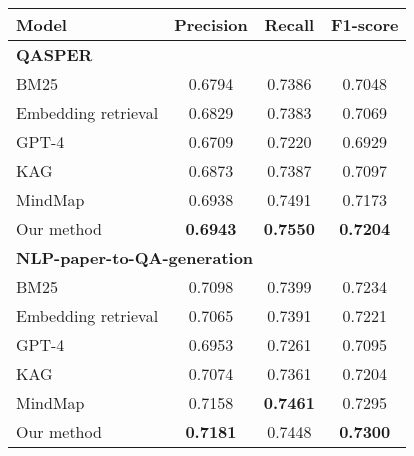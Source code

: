 \begin{tabular}{lccc}
\toprule
\textbf{Model} & \textbf{Precision} & \textbf{Recall} & \textbf{F1-score} \\
\midrule
\multicolumn{4}{l}{\textbf{QASPER}} \\
\midrule
BM25           & 0.6794     & 0.7386     & 0.7048           \\
Embedding retrieval & 0.6829 & 0.7383 & 0.7069           \\
\midrule
GPT-4           & 0.6709     & 0.7220     & 0.6929           \\
\midrule
KAG            & 0.6873     & 0.7387     & 0.7097           \\
MindMap        & 0.6938     & 0.7491     & 0.7173           \\
Our method      & \textbf{0.6943}     & \textbf{0.7550}     & \textbf{0.7204}           \\
\midrule
\multicolumn{4}{l}{\textbf{NLP-paper-to-QA-generation}} \\
\midrule
BM25           & 0.7098     & 0.7399     & 0.7234           \\
Embedding retrieval & 0.7065 & 0.7391 & 0.7221           \\
\midrule
GPT-4           & 0.6953     & 0.7261     & 0.7095           \\
\midrule
KAG            & 0.7074     & 0.7361     & 0.7204           \\
MindMap        & 0.7158     & \textbf{0.7461}     & 0.7295           \\
Our method      & \textbf{0.7181}     & 0.7448     & \textbf{0.7300}           \\
\bottomrule
\end{tabular}